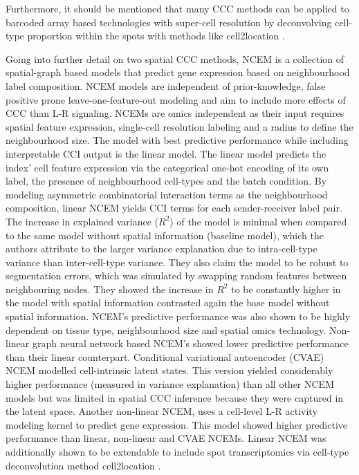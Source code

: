 Furthermore, it should be mentioned that many CCC methods can be applied to barcoded array based technologies with super-cell resolution by deconvolving cell-type proportion within the spots with methods like cell2location \cite{Kleshchevnikov-2022}\cite{Moses-2022}.

Going into further detail on two spatial CCC methods, NCEM is a collection of spatial-graph based models that predict gene expression based on neighbourhood label composition\cite{Fischer-2022}. NCEM models are independent of prior-knowledge, false positive prone leave-one-feature-out modeling and aim to include more effects of CCC than L-R signaling. NCEMs are omics independent as their input requires spatial feature expression, single-cell resolution labeling and a radius to define the neighbourhood size. The model with best predictive performance while including interpretable CCI output is the linear model. The linear model predicts the index' cell feature expression via the categorical one-hot encoding of its own label, the presence of neighbourhood cell-types and the batch condition. By modeling  asymmetric combinatorial interaction terms as the neighbourhood composition, linear NCEM yields CCI terms for each sender-receiver label pair. The increase in explained variance ($R^2$) of the model is minimal when compared to the same model without spatial information (baseline model), which the authors attribute to the larger variance explanation due to intra-cell-type variance than inter-cell-type variance. They also claim the model to be robust to segmentation errors, which was simulated by swapping random features between neighbouring nodes. They showed the increase in $R^2$ to be constantly higher in the model with spatial information contrasted again the base model without spatial information. NCEM's predictive performance was also shown to be highly dependent on tissue type, neighbourhood size and spatial omics technology. Non-linear graph neural network based NCEM's showed lower predictive performance than their linear counterpart. Conditional variational autoencoder (CVAE) NCEM modelled cell-intrinsic latent states. This version yielded considerably higher performance (measured in variance explanation) than all other NCEM models but was limited in spatial CCC inference because they were captured in the latent space. Another non-linear NCEM, uses a cell-level L-R activity modeling kernel to predict gene expression. This model showed higher predictive performance than linear, non-linear and CVAE NCEMs. Linear NCEM was additionally shown to be extendable to include spot transcriptomics via cell-type deconvolution method cell2location \cite{Kleshchevnikov-2022}.

